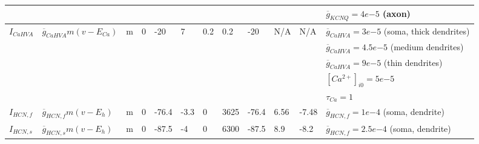 \begin{table}[ht]
\begin{adjustbox}{width=\textwidth}
\begin{tabular}{llllllllllll}
 & & & & & & & & & & & $ \overline{g}_{KCNQ} = 4 e{-5} $ (axon)  \\ \midrule
%
$ I_{CaHVA} $ & $ \overline{g}_{CaHVA} m (v - E_{Ca}) $   & m    & 0       & -20                   & 7                     & 0.2        & 0.2        & -20                 & N/A             & N/A             & $ \overline{g}_{CaHVA} = 3 e{-5} $ (soma, thick dendrites) \\
 & & & & & & & & & & & $ \overline{g}_{CaHVA} = 4.5 e{-5} $ (medium dendrites) \\
 & & & & & & & & & & & $ \overline{g}_{CaHVA} = 9 e{-5} $ (thin dendrites) \\
 & & & & & & & & & & & $ \left[  Ca  ^ { 2 + } \right] _ { i0 } = 5 e{-5} $ \\
 & & & & & & & & & & & $ \tau _ {  Ca } = 1 $ \\ \midrule
%
$ I_{HCN,f} $ & $ \overline{g}_{HCN,f} m (v - E_{h}) $    & m    & 0       & -76.4                 & -3.3                  & 0          & 3625       & -76.4               & 6.56            & -7.48           & $ \overline{g}_{HCN,f} = 1 e{-4} $ (soma, dendrite)  \\ \midrule
%
$ I_{HCN,s} $ & $ \overline{g}_{HCN,s} m (v - E_{h}) $    & m    & 0       & -87.5                 & -4                    & 0          & 6300       & -87.5               & 8.9             & -8.2            & $ \overline{g}_{HCN,f} = 2.5 e{-4} $ (soma, dendrite)  \\ \bottomrule
\end{tabular}
\end{adjustbox}
%
%
\label{tab:gpe_ionic_currents}
\end{table}

%
%
%

%

